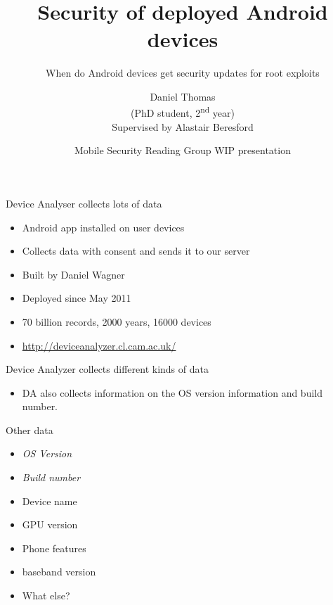 \documentclass{beamer}
\title[Security Updates] %
{Security of deployed Android devices}
\subtitle
{When do Android devices get security updates for root exploits} %
\author[Daniel Thomas] %
{Daniel Thomas\\ \vspace{1em} \tiny{(PhD student, 2\textsuperscript{nd} year)} \\ \vspace{1em} \tiny{Supervised by Alastair Beresford}}
\institute{\vspace{-1em}
University of Cambridge
}
\date[2013-11-13] %
{Mobile Security Reading Group WIP presentation}
\begin{document}
\begin{frame}
  \titlepage
\end{frame}


\begin{frame}{Device Analyser collects lots of data}{}
 \begin{itemize}
  \note{}
  \item Android app installed on user devices
  \item Collects data with consent and sends it to our server
  \item Built by Daniel Wagner
  \note{\\}
  \item Deployed since May 2011
  \note{\\}
  \item 70 billion records, 2000 years, 16000 devices %
  \item \url{http://deviceanalyzer.cl.cam.ac.uk/}
 \end{itemize}
 \begin{center}
 \end{center}
\end{frame}

\begin{frame}{Device Analyzer collects different kinds of data}{}
 \begin{center}
  \vspace{-1em}
    
 \end{center}
 \vspace{-1.5em}
 \begin{itemize}
  \item DA also collects information on the OS version information and build number.
  \note{}
 \end{itemize}
\end{frame}

\begin{frame}{Other data}{}
\begin{itemize}
 \item \Large{ \emph{OS Version}}
 \item \emph{Build number}
 \item Device name
 \item GPU version
 \item Phone features
 \item baseband version
 \item What else?
\end{itemize}
\end{frame}
\end{document}
